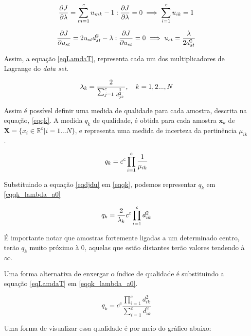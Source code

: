 \documentclass[]{article}
\begin{document}
	\begin{equation}
	\label{eqdjdl}
	{{\partial J} \over {\partial \lambda}} = \sum_{m=1}^c u_{mk}-1 : {{\partial J} \over {\partial \lambda}} = 0 \implies \sum_{i=1}^c u_{ik}=1
	\end{equation}
	
	\begin{equation}
	\label{eqdjdu}
	{{\partial J} \over {\partial u_{st}}} = 2u_{st} d_{st}^2 - \lambda : {{\partial J} \over {\partial u_{st}}} = 0 \implies u_{st} = {\lambda \over {2d_{st}^2}}
	\end{equation}
	
	Assim, a equação \ref{eqLamdaT}, representa cada um dos multiplicadores de Lagrange do \textit{data set}.
	
	\begin{equation}
	\label{eqLamdaT}
	\lambda_{k} = {2 \over {\sum_{j=1}^c {1 \over d_{jk}^2}}}, \quad k=1,2...,N
	\end{equation}
	
	Assim é possível definir uma medida de qualidade para cada amostra, descrita na equação, \ref{eqqk}. A medida $q_k$ de qualidade, é obtida para cada amostra $\mathbf{x}_k$ de $\mathbf{X}=\{x_i \in \mathbb{R^d} | i=1...N\}$, e representa uma medida de incerteza da pertinência $\mu_{ik}$.
	
	\begin{equation}
	\label{eqqk}
	q_k = c^c \prod_{i=1}^c {1 \over \mu_{ik}}
	\end{equation}
	
	Substituindo a equação \ref{eqdjdu} em \ref{eqqk}, podemos representar $q_k$ em \ref{eqqk_lambda_a0}
	
	\begin{equation}
	\label{eqqk_lambda_a0}
	q_k = {2 \over {\lambda_k}} c^c \prod_{i=1}^c d_{ik}^2
	\end{equation}
	
	É importante notar que amostras fortemente ligadas a um determinado centro, terão $q_k$ muito próximo à $0$, aquelas que estão distantes terão valores tendendo à $\infty$.
	
	Uma forma alternativa de enxergar o índice de qualidade é substituindo a equação \ref{eqLamdaT} em \ref{eqqk_lambda_a0}.
	
	\begin{equation}
	\label{qk_final}
	q_k = c^c  \frac{ \prod_{i=1}^c d_{ik}^2} {\sum_{i = 1}^{c}d_{ik}^2}
	\end{equation}
	
	Uma forma de visualizar essa qualidade é por meio do gráfico abaixo:
	
\end{document}
